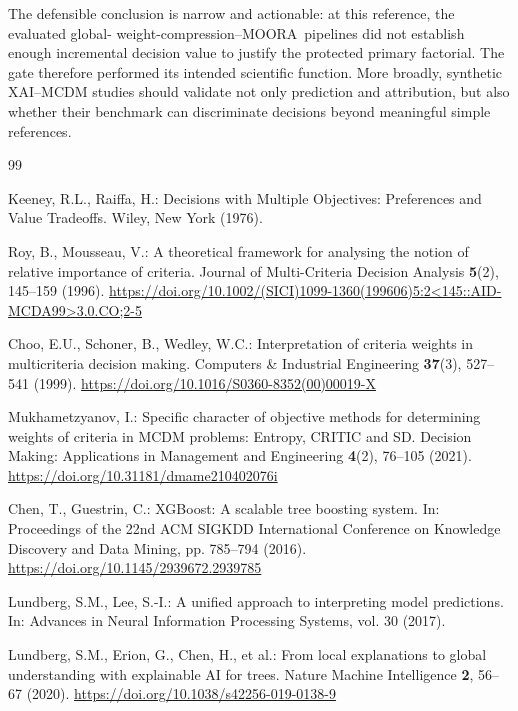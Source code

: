 \documentclass[runningheads]{llncs}
\newcommand{\MOORA}{MOORA}
\begin{document}
The defensible conclusion is narrow and actionable: at this reference, the evaluated global-
weight-compression--\MOORA\ pipelines did not establish enough incremental decision value to
justify the protected primary factorial. The gate therefore performed its intended scientific
function. More broadly, synthetic XAI--MCDM studies should validate not only prediction and
attribution, but also whether their benchmark can discriminate decisions beyond meaningful
simple references.

\begin{thebibliography}{99}

Keeney, R.L., Raiffa, H.:
Decisions with Multiple Objectives: Preferences and Value Tradeoffs.
Wiley, New York (1976).

Roy, B., Mousseau, V.:
A theoretical framework for analysing the notion of relative importance of criteria.
Journal of Multi-Criteria Decision Analysis \textbf{5}(2), 145--159 (1996).
\url{https://doi.org/10.1002/(SICI)1099-1360(199606)5:2<145::AID-MCDA99>3.0.CO;2-5}

Choo, E.U., Schoner, B., Wedley, W.C.:
Interpretation of criteria weights in multicriteria decision making.
Computers \& Industrial Engineering \textbf{37}(3), 527--541 (1999).
\url{https://doi.org/10.1016/S0360-8352(00)00019-X}

Mukhametzyanov, I.:
Specific character of objective methods for determining weights of criteria in MCDM problems:
Entropy, CRITIC and SD.
Decision Making: Applications in Management and Engineering \textbf{4}(2), 76--105 (2021).
\url{https://doi.org/10.31181/dmame210402076i}

Chen, T., Guestrin, C.:
XGBoost: A scalable tree boosting system.
In: Proceedings of the 22nd ACM SIGKDD International Conference on Knowledge Discovery and Data
Mining, pp. 785--794 (2016).
\url{https://doi.org/10.1145/2939672.2939785}

Lundberg, S.M., Lee, S.-I.:
A unified approach to interpreting model predictions.
In: Advances in Neural Information Processing Systems, vol. 30 (2017).

Lundberg, S.M., Erion, G., Chen, H., et al.:
From local explanations to global understanding with explainable AI for trees.
Nature Machine Intelligence \textbf{2}, 56--67 (2020).
\url{https://doi.org/10.1038/s42256-019-0138-9}


\end{thebibliography}
\end{document}
